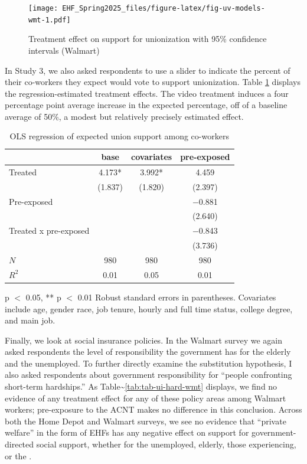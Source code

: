 \documentclass[
  11pt,
  oneside]{article}
\begin{document}
\begin{figure}
\centering
\texttt{[image: EHF\_Spring2025\_files/figure-latex/fig-uv-models-wmt-1.pdf]}
\caption{\label{fig:fig-uv-models-wmt}Treatment effect on support for unionization with 95\% confidence intervals (Walmart)}
\end{figure}

In Study 3, we also asked respondents to use a slider to indicate the percent of their co-workers they expect would vote to support unionization. Table \ref{tab:tab-usupp-models-wmt} displays the regression-estimated treatment effects. The video treatment induces a four percentage point average increase in the expected percentage, off of a baseline average of 50\%, a modest but relatively precisely estimated effect.

\begin{table}
\centering
\caption{\label{tab:tab-uv-models-wmt}OLS regression of expected union support among co-workers \label{tab:tab-usupp-models-wmt}}
\centering
\begin{threeparttable}
\begin{tabular}[t]{lccc}
\toprule
  & base & covariates & pre-exposed\\
\midrule
Treated & \num{4.173}* & \num{3.992}* & \num{4.459}\\
 & (\num{1.837}) & (\num{1.820}) & (\num{2.397})\\
Pre-exposed &  &  & \num{-0.881}\\
 &  &  & (\num{2.640})\\
Treated x pre-exposed &  &  & \num{-0.843}\\
 &  &  & (\num{3.736})\\
\midrule
$N$ & \num{980} & \num{980} & \num{980}\\
$R^2$ & \num{0.01} & \num{0.05} & \num{0.01}\\
\bottomrule
\end{tabular}
\begin{tablenotes}
\item * p $<$ 0.05, ** p $<$ 0.01 Robust standard errors in parentheses. Covariates include age, gender race, job tenure, hourly and full time status, college degree, and main job.
\end{tablenotes}
\end{threeparttable}
\end{table}

Finally, we look at social insurance policies. In the Walmart survey we again asked respondents the level of responsibility the government has for the elderly and the unemployed. To further directly examine the substitution hypothesis, I also asked respondents about government responsibility for ``people confronting short-term hardships.'' As Table\textasciitilde\ref{tab:tab-ui-hard-wmt} displays, we find no evidence of any treatment effect for any of these policy areas among Walmart workers; pre-exposure to the ACNT makes no difference in this conclusion. Across both the Home Depot and Walmart surveys, we see no evidence that ``private welfare'' in the form of EHFs has any negative effect on support for government-directed social support, whether for the unemployed, elderly, those experiencing, or the .
\end{document}

